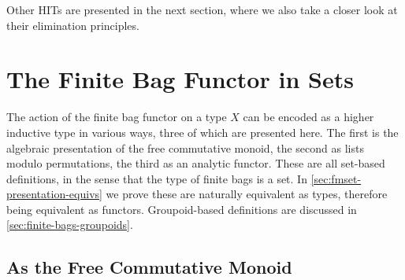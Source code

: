 \documentclass[final,a4paper,USenglish,cleveref]{lipics-v2021}
\begin{document}
Other HITs are presented in the next section, where we also take a closer look at their elimination principles.



\section{The Finite Bag Functor in Sets}\label{sec:finite-bags-sets}

The action of the finite bag functor on a type $X$ can be encoded as a higher inductive
type in various ways, three of which are presented here.
The first is the algebraic presentation of the free commutative monoid, the second as lists modulo permutations, the third as an analytic functor.
These are all set-based definitions, in the sense that the type of finite bags is a set.
In \cref{sec:fmset-presentation-equivs} we prove these are naturally equivalent as types,
therefore being equivalent as functors.
Groupoid-based definitions are discussed in \cref{sec:finite-bags-groupoids}.

\subsection{As the Free Commutative Monoid}
\end{document}
